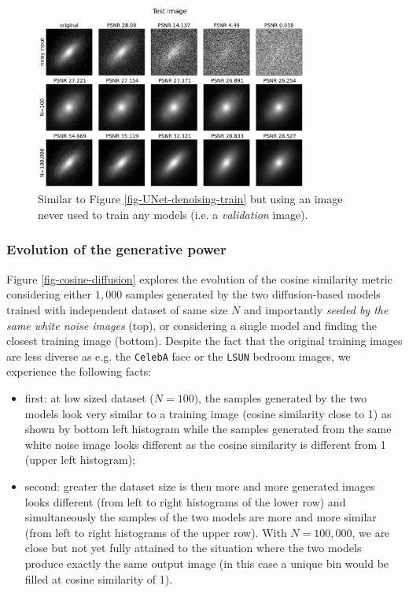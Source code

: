 \documentclass[11pt]{amsart}
\begin{document}
\begin{figure}
    \centering
	\includegraphics[width=0.8\textwidth]{fig-UNet_denoising_perf_test.pdf}
	\caption{Similar to Figure \ref{fig-UNet-denoising-train} but  using an image never used to train any models (i.e. a \textit{validation} image). }
	\label{fig-UNet-denoising-test}
\end{figure}
%
\subsubsection{Evolution of the generative power}
Figure \ref{fig-cosine-diffusion} explores the evolution of the cosine similarity metric \citep{books/aw/TanSK2005} considering either $1,000$ samples generated by the two diffusion-based models trained with independent dataset of same size $N$ and importantly \textit{seeded by the same white noise images} (top), or considering a single model and finding the closest training image (bottom). Despite the fact that the original training images are less diverse as e.g. the \texttt{CelebA} face or the \texttt{LSUN} bedroom images, we experience the following facts: 
\begin{itemize}
\item first: at low sized dataset ($N=100$), the samples generated by the two models look very similar to a training image (cosine similarity close to 1) as shown by bottom left histogram while the samples generated from the same white noise image looks different as the cosine similarity is different from 1 (upper left histogram);
\item second: greater the dataset size is then more and more generated images looks different (from left to right histograms of the lower row) and simultaneously the samples of the two models are more and more similar (from left to right histograms of the upper row). With $N=100,000$, we are close but not yet fully attained to the situation where the two models produce exactly the same output image (in this case a unique bin would be filled at cosine similarity of 1). 
\end{itemize}
\end{document}
